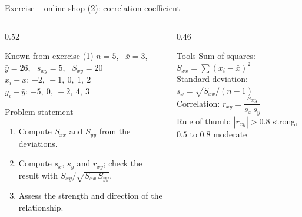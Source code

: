 \documentclass[aspectratio=169,11pt]{beamer}
\newcommand{\minlineskip}{%
  \setlength{\lineskiplimit}{2pt}\setlength{\lineskip}{2pt}%
  \setlength{\normallineskiplimit}{2pt}\setlength{\normallineskip}{2pt}}
\begin{document}
\begin{frame}{Exercise -- online shop (2): correlation coefficient}
  \begin{columns}[T]
    \begin{column}{0.52\textwidth}
      \small
      \begin{block}{Known from exercise (1)}
        $n = 5$, \ $\bar{x} = 3$, \ $\bar{y} = 26$, \ $s_{xy} = 5$, \
        $S_{xy} = 20$\\[2pt]
        $x_i - \bar{x}$: $-2,\ -1,\ 0,\ 1,\ 2$\\[2pt]
        $y_i - \bar{y}$: $-5,\ 0,\ -2,\ 4,\ 3$
      \end{block}
      \begin{block}{Problem statement}
        \begin{enumerate}
          \item Compute $S_{xx}$ and $S_{yy}$ from the deviations.
          \item Compute $s_x$, $s_y$ and $r_{xy}$; check the result with
                $S_{xy} / \sqrt{S_{xx}\,S_{yy}}$.
          \item Assess the strength and direction of the relationship.
        \end{enumerate}
      \end{block}
    \end{column}
    \begin{column}{0.46\textwidth}
      \small\minlineskip
      \begin{exampleblock}{Tools}
        Sum of squares: $S_{xx} = \sum (x_i - \bar{x})^{2}$\\[3pt]
        Standard deviation: $s_x = \sqrt{S_{xx} / (n-1)}$\\[3pt]
        Correlation: $r_{xy} = \dfrac{s_{xy}}{s_x\,s_y}$\\[3pt]
        Rule of thumb: $|r_{xy}| > 0.8$ strong, $0.5$ to $0.8$ moderate
      \end{exampleblock}
    \end{column}
  \end{columns}
\end{frame}
\end{document}
